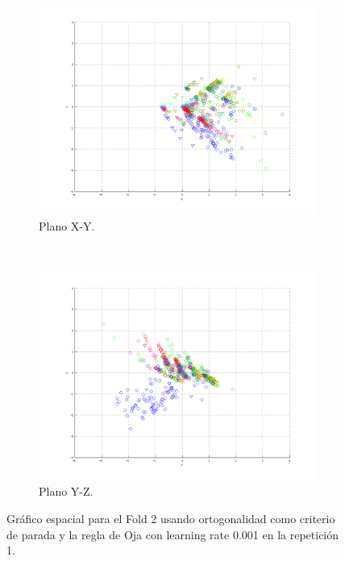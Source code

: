 \documentclass[informe.tex]{subfiles}
\begin{document}
\begin{figure}[H]
        \hspace*{-6.5cm}
        \begin{subfigure}[b]{0.49\textwidth}
                \includegraphics[width=\textwidth]{graficos/fold2_criterioParadao_reglaM_alpha0_rep1_2XY.png}
                \caption{Plano X-Y.}
        \end{subfigure}
        ~
        \begin{subfigure}[b]{0.49\textwidth}
                \includegraphics[width=\textwidth]{graficos/fold2_criterioParadao_reglaM_alpha0_rep1_3YZ.png}
                \caption{Plano Y-Z.}
        \end{subfigure}
	\restoregeometry
        \caption{Gráfico espacial para el Fold 2 usando ortogonalidad como criterio de parada y la regla de Oja con learning rate 0.001 en la repetición 1.}
        \label{fig:fold2_criterioParadao_reglaM_alpha0_rep1}
	\end{figure}      
      
\end{document}
